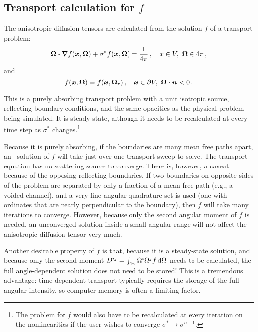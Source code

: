 \subsection{Transport calculation for $f$}

The anisotropic diffusion tensors are calculated from the solution $f$ of a
transport problem:
\begin{equation*}
    \bm{\Omega}\bm{\cdot} \bm{\nabla} f(\bm{x}, \bm{\Omega})
    + \sigma^\ast f (\bm{x}, \bm{\Omega})
  = \frac{1}{4\pi} \,, \quad x \in V,\ \bm{\Omega} \in 4\pi\,,
\end{equation*}
and
\begin{equation*}
  f(\bm{x}, \bm{\Omega}) = f(\bm{x}, \bm{\Omega}_r) \,,
 \quad \bm{x} \in \partial V, \ \bm{\Omega} \bm{\cdot} \bm{n} < 0\,.
\end{equation*}

This is a purely absorbing transport problem with a unit isotropic source,
reflecting boundary conditions, and the same opacities as the physical problem
being simulated. It is steady-state, although it needs to be recalculated at
every time step as $\sigma^*$ changes.\footnote{The problem for $f$ would also
have to be recalculated at every iteration on the nonlinearities if the user
wishes to converge $\sigma^* \to \sigma^{n+1}$.}

Because it is purely absorbing, if the boundaries are many mean free paths
apart, an \SN\ solution of $f$ will take just over one transport sweep to
solve.
The transport equation has no scattering source to converge.
There is, however, a caveat because of the opposing reflecting boundaries. If
two boundaries on opposite sides of the problem are separated by only a
fraction of a mean free path (e.g., a voided channel), and a very fine angular
quadrature set is used (one with ordinates that are nearly perpendicular to the
boundary), then $f$ will take many iterations to converge.
However, because only the second angular moment of $f$ is needed, an
unconverged solution inside a small angular range will not affect the
anisotropic diffusion tensor very much.

Another desirable property of $f$ is that, because it is a steady-state
solution, and because only the second moment
$D^{ij}=\int_{4\pi} \Omega^i \Omega^j f \mathop{}\!\mathrm{d}\Omega$ needs to be calculated, the
full angle-dependent solution does not need to be stored! This is a tremendous
advantage: time-dependent transport typically requires the storage of the full
angular intensity, so computer memory is often a limiting factor.

